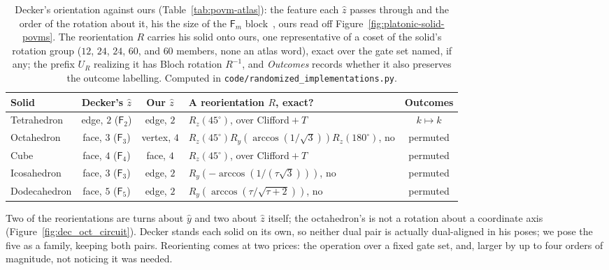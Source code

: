\documentclass[11pt, oneside, openany]{scrbook}
\newcommand{\phig}{\tau} %
\begin{document}
\begin{table}[h]
\centering
\begin{tabular}{@{} l c c l c @{}}
\toprule
Solid & Decker's $\hat z$ & Our $\hat z$ & A reorientation $R$, exact? & Outcomes \\
\midrule
Tetrahedron  & edge, $2$ ($\mathsf{F}_2$)   & edge, $2$   & $R_z(45^\circ)$, over Clifford${}+T$ & $k \mapsto k$ \\
Octahedron   & face, $3$ ($\mathsf{F}_3$)   & vertex, $4$ & $R_z(45^\circ)R_y(\arccos(1/\sqrt3))R_z(180^\circ)$, no & permuted \\
Cube         & face, $4$ ($\mathsf{F}_4$)   & face, $4$   & $R_z(45^\circ)$, over Clifford${}+T$ & permuted \\
Icosahedron  & face, $3$ ($\mathsf{F}_3$)   & edge, $2$   & $R_y(-\arccos(1/(\phig\sqrt3)))$, no & permuted \\
Dodecahedron & face, $5$ ($\mathsf{F}_5$)   & edge, $2$   & $R_y(\arccos(\phig/\sqrt{\phig+2}))$, no & permuted \\
\bottomrule
\end{tabular}
\caption{Decker's orientation against ours (Table~\ref{tab:povm-atlas}): the feature each $\hat z$ passes through and the order of the rotation about it, his the size of the $\mathsf{F}_m$ block~\cite[\S\S4, 6--10]{decker2004quantumcircuitssinglequbit}, ours read off Figure~\ref{fig:platonic-solid-povms}. The reorientation $R$ carries his solid onto ours, one representative of a coset of the solid's rotation group ($12$, $24$, $24$, $60$, and $60$ members, none an atlas word), exact over the gate set named, if any; the prefix $U_R$ realizing it has Bloch rotation $R^{-1}$, and \textit{Outcomes} records whether it also preserves the outcome labelling. Computed in \texttt{code/randomized\_implementations.py}.}
\label{tab:decker-pose}
\end{table}

Two of the reorientations are turns about $\hat y$ and two about $\hat z$ itself; the octahedron's is not a rotation about a coordinate axis (Figure~\ref{fig:dec_oct_circuit}). Decker stands each solid on its own, so neither dual pair is actually dual-aligned in his poses; we pose the five as a family, keeping both pairs. Reorienting comes at two prices: the operation over a fixed gate set, and, larger by up to four orders of magnitude, not noticing it was needed.
\end{document}
